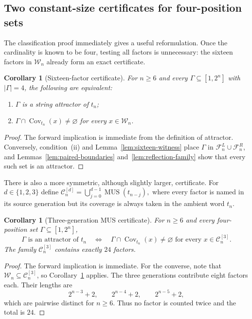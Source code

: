 \documentclass[10pt,a4paper]{article}
\newtheorem{corollary}[theorem]{Corollary}
\theoremstyle{definition}\newtheorem{definition}[theorem]{Definition}
\theoremstyle{remark}\newtheorem{remark}[theorem]{Remark}
\newcommand{\Cov}{\operatorname{Cov}}
\newcommand{\MUS}{\operatorname{MUS}}
\newcommand{\FL}{\mathcal{F}^{L}}
\newcommand{\FR}{\mathcal{F}^{R}}
\begin{document}
\subsection{Two constant-size certificates for four-position sets}
\label{subsec:constant-certificates}

The classification proof immediately gives a useful reformulation.  Once the cardinality is known to be four, testing all factors is unnecessary: the sixteen factors in $\mathcal W_n$ already form an exact certificate.

\begin{corollary}[Sixteen-factor certificate]
\label{cor:sixteen-certificate}
For $n\ge6$ and every $\Gamma\subseteq[1,2^n]$ with $|\Gamma|=4$, the following are equivalent:
\begin{enumerate}[label=(\roman*),leftmargin=*]
\item $\Gamma$ is a string attractor of $t_n$;
\item $\Gamma\cap\Cov_{t_n}(x)\ne\varnothing$ for every $x\in\mathcal W_n$.
\end{enumerate}
\end{corollary}

\begin{proof}
The forward implication is immediate from the definition of attractor.  Conversely, condition~(ii) and Lemma~\ref{lem:sixteen-witness} place $\Gamma$ in $\FL_n\cup\FR_n$, and Lemmas~\ref{lem:paired-boundaries} and~\ref{lem:reflection-family} show that every such set is an attractor.
\end{proof}

There is also a more symmetric, although slightly larger, certificate.  For $d\in\{1,2,3\}$ define
$
 \mathcal C_n^{[d]}=\bigcup_{j=0}^{d-1}\MUS(t_{n-j}),
$
where every factor is named in its source generation but its coverage is always taken in the ambient word $t_n$.

\begin{corollary}[Three-generation MUS certificate]
\label{cor:three-generation}
For $n\ge6$ and every four-position set $\Gamma\subseteq[1,2^n]$,
\[
 \Gamma\text{ is an attractor of }t_n
 \quad\Longleftrightarrow\quad
 \Gamma\cap\Cov_{t_n}(x)\ne\varnothing
 \text{ for every }x\in\mathcal C_n^{[3]}.
\]
The family $\mathcal C_n^{[3]}$ contains exactly $24$ factors.
\end{corollary}

\begin{proof}
The forward implication is immediate.  For the converse, note that $\mathcal W_n\subseteq\mathcal C_n^{[3]}$, so Corollary~\ref{cor:sixteen-certificate} applies.  The three generations contribute eight factors each.  Their lengths are
\[
 2^{n-3}+2,\qquad 2^{n-4}+2,\qquad 2^{n-5}+2,
\]
which are pairwise distinct for $n\ge6$.  Thus no factor is counted twice and the total is $24$.
\end{proof}
\end{document}
